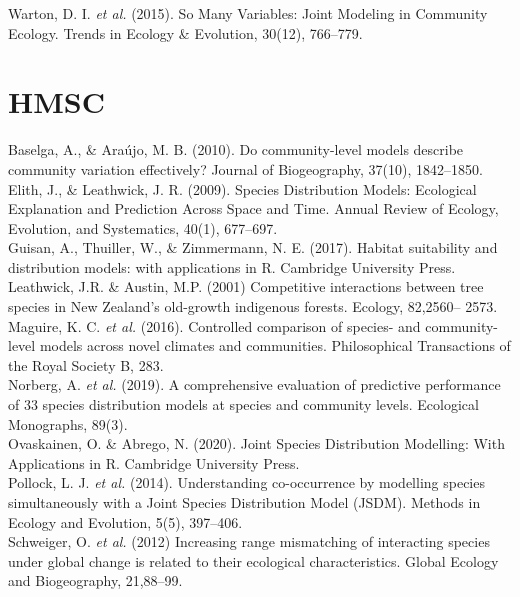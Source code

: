 \documentclass{article}
\begin{document}
Warton, D. I. \textit{et al.} (2015). So Many Variables: Joint Modeling in Community Ecology. Trends in Ecology \& Evolution, 30(12), 766–779. 

\section{HMSC}

Baselga, A., \& Araújo, M. B. (2010). Do community-level models describe community variation effectively? Journal of Biogeography, 37(10), 1842–1850.\\

Elith, J., \& Leathwick, J. R. (2009). Species Distribution Models: Ecological Explanation and Prediction Across Space and Time. Annual Review of Ecology, Evolution, and Systematics, 40(1), 677–697.\\

Guisan, A., Thuiller, W., & Zimmermann, N. E. (2017). Habitat suitability and distribution models: with applications in R. Cambridge University Press.\\

Leathwick, J.R. \& Austin, M.P. (2001) Competitive interactions between tree species in New Zealand’s old-growth indigenous forests. Ecology, 82,2560– 2573.\\

Maguire, K. C. \textit{et al.} (2016). Controlled comparison of species- and community-level models across novel climates and communities. Philosophical Transactions of the Royal Society B, 283.\\

Norberg, A. \textit{et al.} (2019). A comprehensive evaluation of predictive performance of 33 species distribution models at species and community levels. Ecological Monographs, 89(3). \\

Ovaskainen, O. \& Abrego, N. (2020). Joint Species Distribution Modelling: With Applications in R. Cambridge University Press.\\

Pollock, L. J. \textit{et al.} (2014). Understanding co-occurrence by modelling species simultaneously with a Joint Species Distribution Model (JSDM). Methods in Ecology and Evolution, 5(5), 397–406.\\ 

Schweiger, O. \textit{et al.} (2012) Increasing range mismatching of interacting species under global change is related to their ecological characteristics. Global Ecology and Biogeography, 21,88–99. \\
\end{document}
